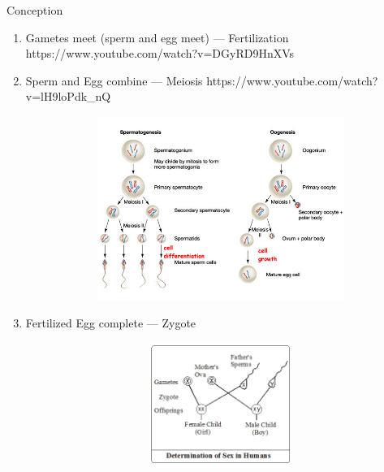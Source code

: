 \documentclass{beamer} %
\begin{document}
\begin{frame}{Conception}
\begin{enumerate}
    \item <1-8> Gametes meet (sperm and egg meet) --- Fertilization
     {https://www.youtube.com/watch?v=DGyRD9HnXVs}
    \item <3-8> Sperm and Egg combine --- Meiosis
     {https://www.youtube.com/watch?v=lH9loPdk_nQ}
     {\begin{figure}
        \includegraphics[width=15cm,
  height=6cm,
  keepaspectratio]{sf45x3.jpg}
    \end{figure}}
    \item <6-8> Fertilized Egg complete --- Zygote
     {\begin{figure}
        \includegraphics[width=15cm, height=4cm, keepaspectratio]{29330512035_8ac440754f_o.png}
    \end{figure}}
\end{enumerate}
\end{frame}
\end{document}
